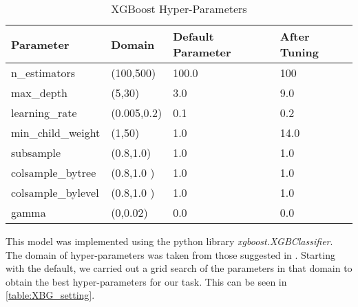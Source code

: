 


\begin{table}[h!]
\begin{center}
 \begin{tabular}{ | p{3cm}| p{3cm} | p{3cm} | p{3cm}|}
 \hline
  Parameter & Domain & Default Parameter & After Tuning

  \\ [0.5ex] 
 \hline\hline
n\_estimators & (100,500)& 100.0 & 100 \\ \hline
max\_depth & (5,30) & 3.0 & 9.0 \\ \hline
learning\_rate & (0.005,0.2) & 0.1 & 0.2 \\ \hline
min\_child\_weight & (1,50) & 1.0 & 14.0 \\\hline
subsample & (0.8,1.0) & 1.0 & 1.0 \\\hline
colsample\_bytree &(0.8,1.0 ) &1.0 & 1.0 \\\hline
 colsample\_bylevel &(0.8,1.0 ) &1.0 & 1.0 \\\hline
gamma & (0,0.02)&0.0 & 0.0 \\\hline

\end{tabular}
\end{center}

    \caption{XGBoost Hyper-Parameters}
\label{table:XBG_setting}
\end{table}


This model was implemented using the python library \textit{xgboost.XGBClassifier}. The domain of hyper-parameters was taken from those suggested in
\cite{wang2019xgboost}. 
Starting with the default, we carried out a  grid search of the parameters in that domain to obtain the best hyper-parameters for our task. This can be seen in \autoref{table:XBG_setting}.

